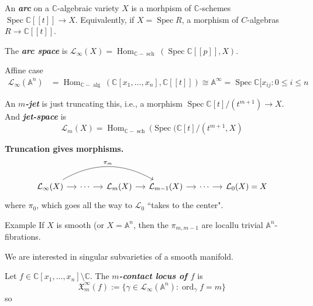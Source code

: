 \begin{defn}\leavevmode
	An \textit{\textbf{arc}} on a \(\mathbb{C}\)-algebraic variety \(X\) is a morhpism of \(\mathbb{C}\)-schemes \(\operatorname{Spec}\mathbb{C}[[t]] \to X\). Equivalently, if \(X = \operatorname{Spec} R\), a morphism of \(C\)-algebras \(R \to \mathbb{C}[[t]]\).

	The \textit{\textbf{arc space}} is \(\mathcal{L}_\infty(X) = \operatorname{Hom}_{\mathbb{C}-\operatorname{s c h}}(\operatorname{Spec} \mathbb{C}[[p ]],X)\).
\end{defn}

\begin{thing6}{Affine case}\leavevmode
\begin{align*}
	\mathcal{L}_{\infty}(\mathbb{A}^n)&=\operatorname{Hom}_{\mathbb{C}-\operatorname{a l g}}(\mathbb{C}[x_1,\ldots,x_n],\mathbb{C}[ [ t ] ]) \cong \mathbb{A}^\infty= \operatorname{Spec} \mathbb{C}[x_{ij}:0 \leq  i \leq n
\end{align*}
\end{thing6}

\begin{defn}\leavevmode
	An \textit{\textbf{\(m\)-jet}} is just truncating this, i.e., a morphism \(\operatorname{Spec}\mathbb{C}[t]/(t^{m+1}) \to X\). And \textit{\textbf{jet-space}} is
	\[\mathcal{L}_m(X)= \operatorname{Hom}_{\mathbb{C}-\operatorname{s c h}}(\operatorname{Spec}(\mathbb{C}[t]/(t^{m+1},X)\]
\end{defn}

\textbf{Truncation gives morphisms.} 
\[\begin{tikzcd}[column sep=small]
	\mathcal{L}_\infty(X)\arrow[r]\arrow[rrr,bend left,"\pi_m"]&\cdots \arrow[r]&\mathcal{L}_m(X)\arrow[r]&\mathcal{L}_{m-1}(X)\arrow[r]&\cdots \arrow[r]&\mathcal{L}_0(X)=X
\end{tikzcd}\]
where \(\pi_0\), which goes all the way to \(\mathcal{L}_0\) ``takes to the center".
\begin{thing4}{Example}\leavevmode
If \(X\) is smooth (or \(X= \mathbb{A}^n\), then the  \(\pi_{m,m-1}\) are locallu trivial \(\mathbb{A}^n\)-fibrations.
\end{thing4}

{\color{6}We are interested in singular subvarieties of a smooth manifold.}

\begin{defn}\leavevmode
	Let \(f \in \mathbb{C}[x_1,\ldots,x_n]\setminus \mathbb{C}\). The \textit{\textbf{\(m\)-contact locus of \(f\)}} is
	\[\mathfrak{X}_{m}^\infty(f):=\{\gamma \in \mathcal{L}_\infty(\mathbb{A}^n): \operatorname{ord}_\gamma f=m\}\]
	so
\end{defn}\fi

